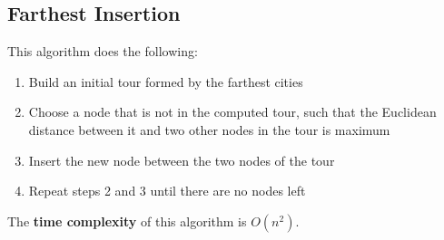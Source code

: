 \documentclass{article}
\begin{document}
\subsection{Farthest Insertion}
This algorithm does the following:

\begin{enumerate}
	\item Build an initial tour formed by the farthest cities
	\item Choose a node that is not in the computed tour, such that the Euclidean distance between it and two other nodes in the tour is maximum
	\item Insert the new node between the two nodes of the tour
	\item Repeat steps 2 and 3 until there are no nodes left
\end{enumerate}
The \textbf{time complexity} of this algorithm is $O(n^2)$.
\end{document}
